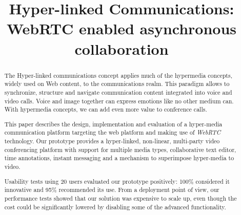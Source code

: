 \documentclass[10pt,conference]{IEEEtran}
\begin{document}
\title{Hyper-linked Communications: WebRTC enabled asynchronous collaboration}

\author{
\and
{}
}

\maketitle

\begin{abstract}
The Hyper-linked communications concept applies much of the hypermedia concepts, widely used on Web content, to the communications realm.
This paradigm allows to synchronize, structure and navigate communication content integrated into voice and video calls.
Voice and image together can express emotions like no other medium can. 
With hypermedia concepts, we can add even more value to conference calls.

This paper describes the design, implementation and evaluation of a hyper-media communication platform targeting the web platform and making use of \emph{WebRTC} technology.
Our prototype provides a hyper-linked, non-linear, multi-party video conferencing platform with support for multiple media types, collaborative text editor, time annotations, instant messaging and a mechanism to superimpose hyper-media to video.

Usability tests using 20 users evaluated our prototype positively: 100\% considered it innovative and 95\% recommended its use. 
From a deployment point of view, our performance tests showed that our solution was expensive to scale up, even though the cost could be significantly lowered by disabling some of the advanced functionality.


\end{abstract}

\IEEEpeerreviewmaketitle
\end{document}

